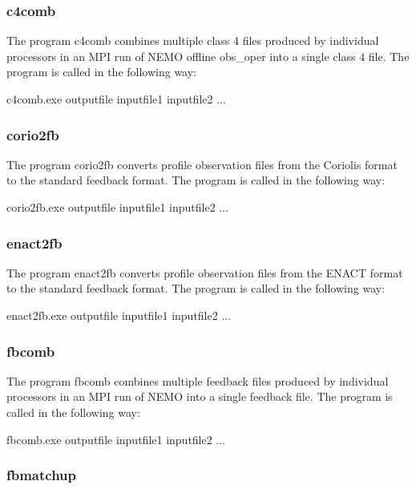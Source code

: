 \documentclass[../tex_main/NEMO_manual]{subfiles}
\begin{document}
\subsubsection{c4comb}

The program c4comb combines multiple class 4 files produced by individual processors in
an MPI run of NEMO offline obs\_oper into a single class 4 file.
The program is called in the following way:


\footnotesize
\begin{cmds}
c4comb.exe outputfile inputfile1 inputfile2 ...
\end{cmds}

\subsubsection{corio2fb}

The program corio2fb converts profile observation files from the Coriolis format to the standard feedback format.
The program is called in the following way:

\footnotesize
\begin{cmds}
corio2fb.exe outputfile inputfile1 inputfile2 ...
\end{cmds}

\subsubsection{enact2fb}

The program enact2fb converts profile observation files from the ENACT format to the standard feedback format.
The program is called in the following way:

\footnotesize
\begin{cmds}
enact2fb.exe outputfile inputfile1 inputfile2 ...
\end{cmds}

\subsubsection{fbcomb}

The program fbcomb combines multiple feedback files produced by individual processors in
an MPI run of NEMO into a single feedback file.
The program is called in the following way:

\footnotesize
\begin{cmds}
fbcomb.exe outputfile inputfile1 inputfile2 ...
\end{cmds}

\subsubsection{fbmatchup}
\end{document}
